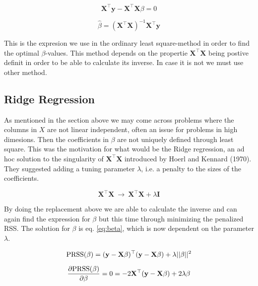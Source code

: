 \documentclass[a4paper,12pt, english]{article}
\begin{document}
\begin{equation}
\mathbf{X}^{\top}\mathbf{y} - \mathbf{X}^{\top}\mathbf{X} \beta = 0
\end{equation}

\begin{equation}
\hat{\beta} = (\mathbf{X}^{\top}\mathbf{X})^{-1}\mathbf{X}^{\top}\mathbf{y}
\end{equation}

This is the expresion we use in the ordinary least square-method in order to find the optimal $\beta$-values. This method depends on the propertie $\mathbf{X^{\top}}\mathbf{X}$ being postive definit in order to be able to calculate its inverse. In case it is not we must use other method.

\subsection*{Ridge Regression}

As mentioned in the section above we may come across problems where the columns in $X$ are not linear independent, often an issue for problems in high dimesions. Then the coefficients in $\beta$ are not uniquely defined through least square. This was the motivation for what would be the Ridge regression, an ad hoc solution to the singularity of $\mathbf{X^{\top}}\mathbf{X}$ introduced by Hoerl and Kennard (1970).
They suggested adding a tuning parameter $\lambda$, i.e. a penalty to the sizes of the coefficients.

\begin{equation}
\mathbf{X}^{\top}\mathbf{X} \ \rightarrow \ \mathbf{X}^{\top}\mathbf{X} + \lambda\mathbf{I}
\end{equation}

By doing the replacement above we are able to calculate the inverse and can again find the expression for $\beta$ but this time through minimizing the penalized RSS. The solution for $\beta$ is eq. \ref{eq:beta}, which is now dependent on the parameter $\lambda$.

\begin{equation}
\textnormal{PRSS}(\beta) = (\mathbf{y} - \mathbf{X}\beta)^{\top}(\mathbf{y} - \mathbf{X}\beta) + \lambda ||\beta||^2
\end{equation}

\begin{equation}
\frac{\partial \textnormal{PRSS}(\beta)}{\partial \beta} = 0 = -2 \mathbf{X}^{\top}(\mathbf{y} - \mathbf{X}\beta) + 2 \lambda \beta
\end{equation}
\end{document}
